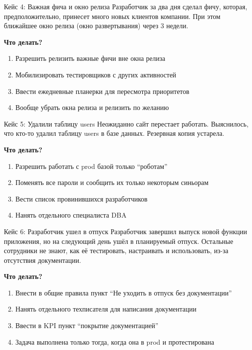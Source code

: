 \documentclass[aspectratio=169]{beamer}
\begin{document}
    \begin{frame}{Кейс 4: Важная фича и окно релиза}
        Разработчик за два дня сделал фичу, которая, предположительно, принесет много новых клиентов компании.
        При этом ближайшее окно релиза (окно развертывания) через 3 недели.

        \vspace{0.5cm}

        \textbf{Что делать?}
        \begin{enumerate}
            \item Разрешить релизить важные фичи вне окна релиза
            \item Мобилизировать тестировщиков с других активностей
            \item Ввести ежедневные планерки для пересмотра приоритетов
            \item Вообще убрать окна релиза и релизить по желанию
        \end{enumerate}
    \end{frame}

    \begin{frame}{Кейс 5: Удалили таблицу users}
        Неожиданно сайт перестает работать. Выяснилось, что кто-то удалил таблицу users в базе данных.
        Резервная копия устарела.

        \vspace{0.5cm}

        \textbf{Что делать?}
        \begin{enumerate}
            \item Разрешить работать с prod базой только \enquote{роботам}
            \item Поменять все пароли и сообщить их только некоторым синьорам
            \item Вести список провинившихся разработчиков
            \item Нанять отдельного специалиста DBA
        \end{enumerate}
    \end{frame}

    \begin{frame}{Кейс 6: Разработчик ушел в отпуск}
        Разработчик завершил выпуск новой функции приложения, но на следующий день ушёл в планируемый отпуск.
        Остальные сотрудники не знают, как её тестировать, настраивать и использовать, из-за отсутствия документации.

        \vspace{0.5cm}

        \textbf{Что делать?}
        \begin{enumerate}
            \item Внести в общие правила пункт \enquote{Не уходить в отпуск без документации}
            \item Нанять отдельного техписателя для написания документации
            \item Ввести в KPI пункт \enquote{покрытие документацией}
            \item Задача выполнена только тогда, когда она в prod и протестирована
        \end{enumerate}
    \end{frame}
\end{document}
